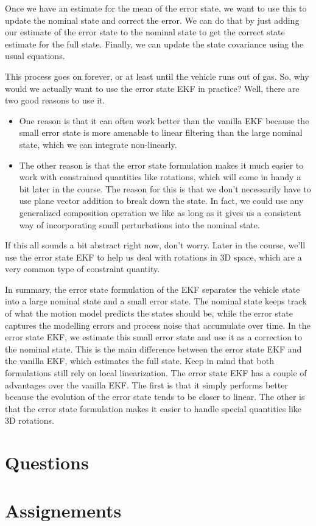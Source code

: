 Once we have an estimate for the mean of
the error state, we want to use this to update the nominal state and
correct the error. We can do that by just adding our estimate
of the error state to the nominal state to get the correct state estimate for the full state. 
Finally, we can update the state covariance using the usual equations.

This process goes on forever, or at least until the vehicle runs out of gas. So, why would we
actually want to use the error state EKF
in practice? Well, there are two
good reasons to use it. 

\begin{itemize}
\item One reason is that it can often work better than the vanilla EKF because the small error
state is more amenable to
linear filtering than the large
nominal state, which we can integrate
non-linearly. 
\item The other reason is that the error state
formulation makes it much easier to work with constrained quantities like rotations, which
will come in handy a bit later in the course. The reason for
this is that we don't necessarily have to use plane vector addition to break down the state. In fact, we could use any generalized
composition operation we like as long as it gives us a consistent way
of incorporating small perturbations
into the nominal state. 
\end{itemize}

If this all sounds a bit abstract right now, don't worry. Later in the
course, we'll use the error state
EKF to help us deal with rotations
in 3D space, which are
a very common type of constraint quantity. 

In summary, the error state formulation of the EKF separates the vehicle state into a large nominal state and a small error state. The nominal state
keeps track of what the motion model predicts the states should be, while the error state captures the
modelling errors and process noise that accumulate over time. In the error state EKF, we estimate
this small error state and use it as a correction to the nominal state. This is the main
difference between the error state EKF and the vanilla EKF, which estimates the full state. Keep in mind that both formulations still rely on
local linearization. The error state EKF has a couple of advantages over the vanilla EKF. The first is that it simply performs better because
the evolution of the error state tends to be closer to linear. The other is that the error state
formulation makes it easier to handle special quantities
like 3D rotations. 
\section{Questions}
\section{Assignements}
